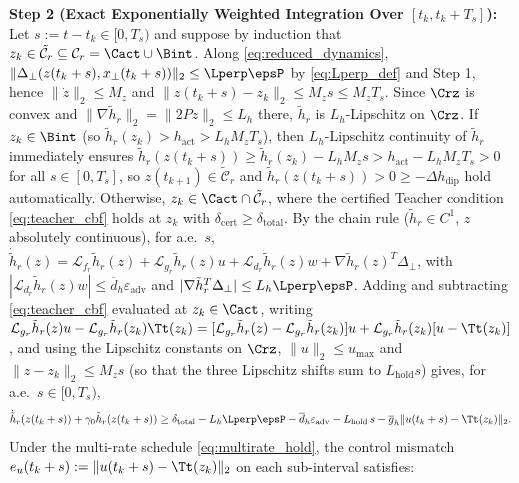 \textbf{Step 2 (Exact Exponentially Weighted Integration Over \([t_k, t_k + T_s]\)):} Let \(s := t - t_k \in [0, T_s)\) and suppose by induction that \(z_k \in \tilde{\mathcal{C}}_r \subseteq \mathcal{C}_r = \Cact \cup \Bint\). Along \eqref{eq:reduced_dynamics}, \(\|\Delta_\perp(z(t_k + s), x_\perp(t_k + s))\|_2 \le \Lperp\epsP\) by \eqref{eq:Lperp_def} and Step 1, hence \(\|\dot z\|_2 \le M_z\) and \(\|z(t_k + s) - z_k\|_2 \le M_z s \le M_z T_s\). Since \(\Crz\) is convex and \(\|\nabla\tilde h_r\|_2 = \|2Pz\|_2 \le L_h\) there, \(\tilde h_r\) is \(L_h\)-Lipschitz on \(\Crz\). If \(z_k \in \Bint\) (so \(\tilde{h}_r(z_k) > h_{\mathrm{act}} > L_h M_z T_s\)), then \(L_h\)-Lipschitz continuity of \(\tilde{h}_r\) immediately ensures \(\tilde{h}_r(z(t_k + s)) \ge \tilde{h}_r(z_k) - L_h M_z s > h_{\mathrm{act}} - L_h M_z T_s > 0\) for all \(s \in [0, T_s]\), so \(z(t_{k+1}) \in \tilde{\mathcal{C}}_r\) and \(\tilde{h}_r(z(t_k + s)) > 0 \ge -\Delta h_{\mathrm{dip}}\) hold automatically. Otherwise, \(z_k \in \Cact \cap \tilde{\mathcal{C}}_r\), where the certified Teacher condition \eqref{eq:teacher_cbf} holds at \(z_k\) with \(\delta_{\mathrm{cert}} \ge \delta_{\mathrm{total}}\). By the chain rule (\(\tilde h_r \in C^1\), \(z\) absolutely continuous), for a.e.\ \(s\), \(\dot{\tilde h}_r(z) = \mathcal{L}_{f_r}\tilde h_r(z) + \mathcal{L}_{g_r}\tilde h_r(z)u + \mathcal{L}_{d_r}\tilde h_r(z)w + \nabla\tilde h_r(z)^T\Delta_\perp\), with \(|\mathcal{L}_{d_r}\tilde h_r(z)w| \le \overline d_h\varepsilon_{\mathrm{adv}}\) and \(|\nabla\tilde h_r^T\Delta_\perp| \le L_h\Lperp\epsP\). Adding and subtracting \eqref{eq:teacher_cbf} evaluated at \(z_k \in \Cact\), writing \(\mathcal{L}_{g_r}\tilde h_r(z)u - \mathcal{L}_{g_r}\tilde h_r(z_k)\Tt(z_k) = [\mathcal{L}_{g_r}\tilde h_r(z) - \mathcal{L}_{g_r}\tilde h_r(z_k)]u + \mathcal{L}_{g_r}\tilde h_r(z_k)[u - \Tt(z_k)]\), and using the Lipschitz constants on \(\Crz\), \(\|u\|_2 \le u_{\max}\) and \(\|z - z_k\|_2 \le M_zs\) (so that the three Lipschitz shifts sum to \(L_{\mathrm{hold}}s\)) gives, for a.e.\ \(s \in [0, T_s)\),
\begin{equation}
\label{eq:ode_diff_ineq}
\dot{\tilde{h}}_r(z(t_k + s)) + \gamma_0 \tilde{h}_r(z(t_k + s)) \ge \delta_{\mathrm{total}} - L_h \Lperp\epsP - \overline{d}_h \varepsilon_{\mathrm{adv}} - L_{\mathrm{hold}}\,s - \overline{g}_h \|u(t_k + s) - \Tt(z_k)\|_2.
\end{equation}
Under the multi-rate schedule \eqref{eq:multirate_hold}, the control mismatch \(e_u(t_k + s) := \|u(t_k + s) - \Tt(z_k)\|_2\) on each sub-interval satisfies:
